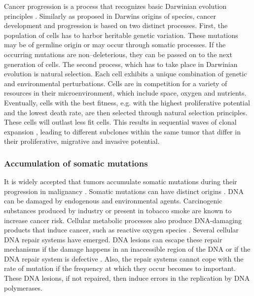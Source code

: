       Cancer progression is a process that recognizes basic Darwinian evolution
      principles {\cite{clonal_evolution}} {\cite{darwinian_models}}
      {\cite{war_zone}} {\cite{cancer_models}}. Similarly as proposed in Darwins
      origins of species,  cancer development and progression is based on two
      distinct processes.  First, the population of cells has to harbor
      heritable genetic variation. These mutations may be of germline origin or
      may occur through somatic processes. If the occurring mutations are
      non--deleterious, they can be passed on to the next generation of cells.
      The second process, which has to take place in Darwinian evolution is
      natural selection. Each cell exhibits a unique combination of genetic and
      environmental perturbations. Cells are in competition for a variety of
      resources in their microenvironment, which include space, oxygen and
      nutrients. Eventually, cells with the best fitness, e.g. with the highest
      proliferative potential and the lowest death rate, are then selected
      through natural selection principles. These cells will outlast less fit
      cells. This results in sequential waves of clonal expansion
      {\cite{clonal_evolution}}, leading to different subclones within the same
      tumor that differ in their proliferative, migrative and invasive
      potential.

    \subsubsection{Accumulation of somatic mutations}

      It is widely accepted that tumors accumulate somatic mutations during
      their progression in malignancy {\cite{accumulation_rates}}
      {\cite{mutations_counting}}. Somatic mutations can have distinct origins
      {\cite{multiple_mutations}}. DNA can be damaged by endogenous and
      environmental agents. Carcinogenic substances produced by industry
      {\cite{occupational_exposure}} {\cite{rubber_industry}} or present in
      tobacco smoke {\cite{smoking_cancer}} are known to increase cancer risk.
      Cellular metabolic processes also produce DNA-damaging products that
      induce cancer, such as reactive oxygen species {\cite{ros_cancer}}
      {\cite{ros_cancer_other}}. Several cellular DNA repair systems have
      emerged. DNA lesions can escape these repair mechanisms if the damage
      happens in an inaccessible region of the DNA or if the DNA repair system
      is defective {\cite{dna_repair}}. Also, the repair systems cannot cope
      with the rate of mutation if the frequency at which they occur becomes to
      important. These DNA lesions, if not repaired, then induce errors in the
      replication by DNA polymerases.

